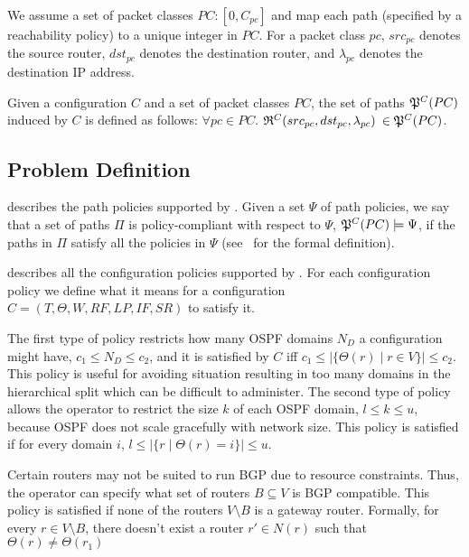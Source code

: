 We assume a set of packet classes $PC : [0,C_{pc}]$ 
and map each path (specified by a reachability policy)    
to a unique integer in $PC$.
For a packet class $pc$, $src_{pc}$ denotes the source router,
$dst_{pc}$ denotes the destination router, and $\lambda_{pc}$
denotes the destination IP address. 


\begin{definition}
Given a configuration $C$ and a set of packet classes $PC$, the set of paths
$\mathfrak{P}^C(PC)$ induced by $C$ is defined as follows: 
$\forall pc \in PC.$ $\mathfrak{R}^C(src_{pc}, dst_{pc}, \lambda_{pc})$ $\in \mathfrak{P}^C(PC)$.
\end{definition}

\subsection{Problem Definition}



 describes the path policies supported by \name.
Given  a set $\Psi$ of
path policies, we say that
a set of paths $\Pi$ is policy-compliant with respect to $\Psi$, $\mathfrak{P}^C(PC) \models \Psi$,
if the paths in $\Pi$ satisfy all the policies in $\Psi$ (see~\cite{genesis} for the formal definition).


 describes all the configuration policies supported by \name.
For each configuration policy 
we define what it means for  a configuration $C=(T,\Theta,W,RF,LP,IF,SR)$ to satisfy it.

The first type of policy restricts how many OSPF domains $N_D$ a
configuration might have, $c_1\leq N_D\leq c_2$, 
and it is satisfied by $C$ iff $c_1\leq |\{\Theta(r)\mid r\in V\}|\leq
c_2$.  This policy is useful for avoiding situation resulting in too
many domains in the hierarchical split which can be difficult to
administer.  The second type of policy allows the operator to restrict
the size $k$ of each OSPF domain, $l\leq k\leq u$, because OSPF does
not scale gracefully with network size.  This policy is satisfied if
for every domain $i$, $l\leq |\{r \mid \Theta(r)=i\}|\leq u$.


Certain 
	routers may not be suited to run BGP due to resource
	constraints. Thus, the operator can specify what set of 
	routers $B\subseteq V$ is BGP compatible.  
	This policy is satisfied if none of the routers $V\setminus B$
	is a gateway router.
	Formally, for every $r\in V\setminus B$,
	there doesn't exist a router $r'\in N(r)$ such that $\Theta(r) \not= \Theta(r_1)$

